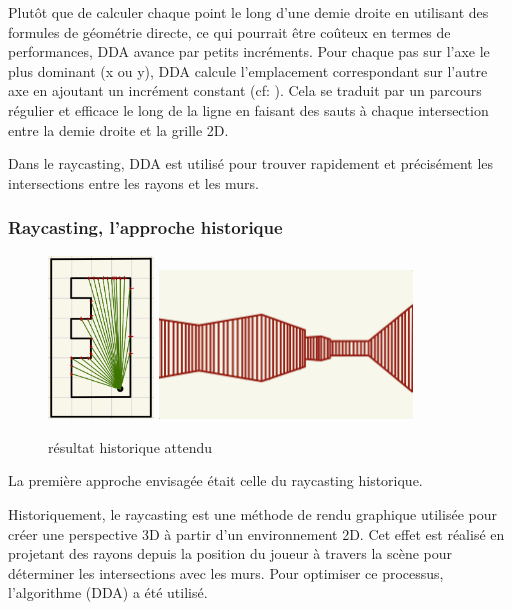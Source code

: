 \documentclass[11pt]{article}
\begin{document}
Plutôt que de calculer chaque point le long d'une demie droite en utilisant des formules de géométrie 
directe, ce qui pourrait être coûteux en termes de performances, DDA avance par petits incréments. Pour chaque pas sur l'axe le plus 
dominant (x ou y), DDA calcule l'emplacement correspondant sur l'autre axe en ajoutant un incrément constant (cf: ). Cela se traduit par un parcours régulier et 
efficace le long de la ligne en faisant des sauts à chaque intersection entre la demie droite et la grille 2D.

Dans le raycasting, DDA est utilisé pour trouver rapidement et précisément les intersections entre les rayons et les murs. 

\subsubsection{Raycasting, l'approche historique}

\begin{figure}
	\center
	\includegraphics[width=0.25\textwidth]{image/projection2D.jpeg}
	\raisebox{2cm}{
		\hspace{2mm}$\Longrightarrow$\hspace{2mm}
	}
	\includegraphics[width=0.6\textwidth]{image/rendu-historique.jpg}
	\caption{résultat historique attendu}
	\label{fig:result-histo}
\end{figure}

La première approche envisagée était celle du raycasting historique.

Historiquement, le raycasting est une méthode de rendu graphique utilisée pour créer une perspective 3D à partir d'un environnement 2D. Cet effet est réalisé en projetant des 
rayons depuis la position du joueur à travers la scène pour déterminer les intersections avec les murs. Pour optimiser ce
processus, l'algorithme (DDA) a été utilisé.
\end{document}
